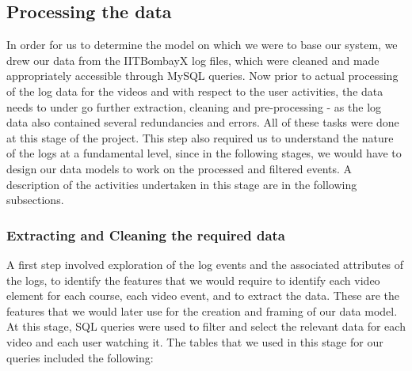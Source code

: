 \documentclass[16pt]{report}
\begin{document}
\subsection{Processing the data}

In order for us to determine the model on which we were to base our system, we drew our data from the  IITBombayX log files, which were cleaned and made appropriately accessible through MySQL queries. Now prior to actual processing of the log data for the videos and with respect to the user activities, the data needs to under go further extraction, cleaning and pre-processing - as the log data also contained several redundancies and errors. All of these tasks were done at this stage of the project. This step also required us to understand the nature of the logs at a fundamental level, since in the following stages, we would have to design our data models to work on the processed and filtered events. A description of the activities undertaken in this stage are in the following subsections.





\subsubsection{Extracting and Cleaning the required data}

A first step involved exploration of the log events and the associated attributes of the logs, to identify the features that we would require to identify each video element for each course, each video event, and to extract the data. These are the features that we would later use for the creation and framing of our data model. At this stage, SQL queries were used to filter and select the relevant data for each video and each user watching it. The tables that we used in this stage for our queries included the following:
\end{document}
